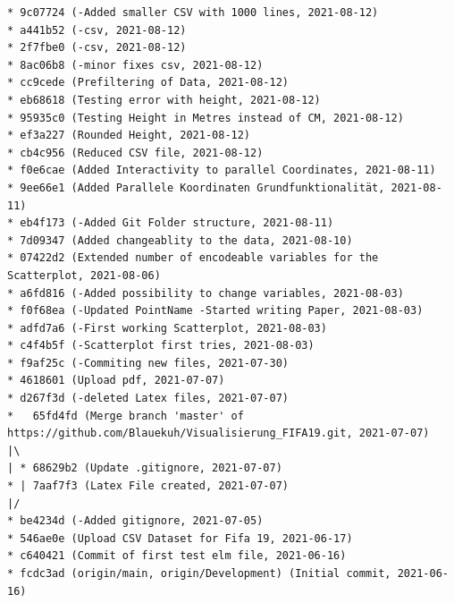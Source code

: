 \documentclass[usegeometry=true]{scrartcl}
\begin{document}
\begin{verbatim}
* 9c07724 (-Added smaller CSV with 1000 lines, 2021-08-12)
* a441b52 (-csv, 2021-08-12)
* 2f7fbe0 (-csv, 2021-08-12)
* 8ac06b8 (-minor fixes csv, 2021-08-12)
* cc9cede (Prefiltering of Data, 2021-08-12)
* eb68618 (Testing error with height, 2021-08-12)
* 95935c0 (Testing Height in Metres instead of CM, 2021-08-12)
* ef3a227 (Rounded Height, 2021-08-12)
* cb4c956 (Reduced CSV file, 2021-08-12)
* f0e6cae (Added Interactivity to parallel Coordinates, 2021-08-11)
* 9ee66e1 (Added Parallele Koordinaten Grundfunktionalität, 2021-08-11)
* eb4f173 (-Added Git Folder structure, 2021-08-11)
* 7d09347 (Added changeablity to the data, 2021-08-10)
* 07422d2 (Extended number of encodeable variables for the Scatterplot, 2021-08-06)
* a6fd816 (-Added possibility to change variables, 2021-08-03)
* f0f68ea (-Updated PointName -Started writing Paper, 2021-08-03)
* adfd7a6 (-First working Scatterplot, 2021-08-03)
* c4f4b5f (-Scatterplot first tries, 2021-08-03)
* f9af25c (-Commiting new files, 2021-07-30)
* 4618601 (Upload pdf, 2021-07-07)
* d267f3d (-deleted Latex files, 2021-07-07)
*   65fd4fd (Merge branch 'master' of 
https://github.com/Blauekuh/Visualisierung_FIFA19.git, 2021-07-07)
|\
| * 68629b2 (Update .gitignore, 2021-07-07)
* | 7aaf7f3 (Latex File created, 2021-07-07)
|/
* be4234d (-Added gitignore, 2021-07-05)
* 546ae0e (Upload CSV Dataset for Fifa 19, 2021-06-17)
* c640421 (Commit of first test elm file, 2021-06-16)
* fcdc3ad (origin/main, origin/Development) (Initial commit, 2021-06-16)
\end{verbatim}



\printbibliography
\end{document}
